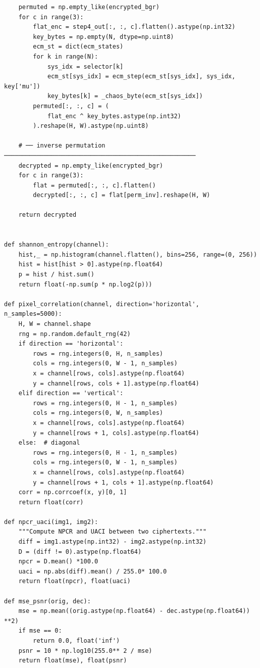 \begin{verbatim}
    permuted = np.empty_like(encrypted_bgr)
    for c in range(3):
        flat_enc = step4_out[:, :, c].flatten().astype(np.int32)
        key_bytes = np.empty(N, dtype=np.uint8)
        ecm_st = dict(ecm_states)
        for k in range(N):
            sys_idx = selector[k]
            ecm_st[sys_idx] = ecm_step(ecm_st[sys_idx], sys_idx, key['mu'])
            key_bytes[k] = _chaos_byte(ecm_st[sys_idx])
        permuted[:, :, c] = (
            flat_enc ^ key_bytes.astype(np.int32)
        ).reshape(H, W).astype(np.uint8)

    # ── inverse permutation ─────────────────────────────────────────────────────
    decrypted = np.empty_like(encrypted_bgr)
    for c in range(3):
        flat = permuted[:, :, c].flatten()
        decrypted[:, :, c] = flat[perm_inv].reshape(H, W)

    return decrypted


def shannon_entropy(channel):
    hist,_ = np.histogram(channel.flatten(), bins=256, range=(0, 256))
    hist = hist[hist > 0].astype(np.float64)
    p = hist / hist.sum()
    return float(-np.sum(p * np.log2(p)))

def pixel_correlation(channel, direction='horizontal', n_samples=5000):
    H, W = channel.shape
    rng = np.random.default_rng(42)
    if direction == 'horizontal':
        rows = rng.integers(0, H, n_samples)
        cols = rng.integers(0, W - 1, n_samples)
        x = channel[rows, cols].astype(np.float64)
        y = channel[rows, cols + 1].astype(np.float64)
    elif direction == 'vertical':
        rows = rng.integers(0, H - 1, n_samples)
        cols = rng.integers(0, W, n_samples)
        x = channel[rows, cols].astype(np.float64)
        y = channel[rows + 1, cols].astype(np.float64)
    else:  # diagonal
        rows = rng.integers(0, H - 1, n_samples)
        cols = rng.integers(0, W - 1, n_samples)
        x = channel[rows, cols].astype(np.float64)
        y = channel[rows + 1, cols + 1].astype(np.float64)
    corr = np.corrcoef(x, y)[0, 1]
    return float(corr)

def npcr_uaci(img1, img2):
    """Compute NPCR and UACI between two ciphertexts."""
    diff = img1.astype(np.int32) - img2.astype(np.int32)
    D = (diff != 0).astype(np.float64)
    npcr = D.mean() *100.0
    uaci = np.abs(diff).mean() / 255.0* 100.0
    return float(npcr), float(uaci)

def mse_psnr(orig, dec):
    mse = np.mean((orig.astype(np.float64) - dec.astype(np.float64)) **2)
    if mse == 0:
        return 0.0, float('inf')
    psnr = 10 * np.log10(255.0** 2 / mse)
    return float(mse), float(psnr)



\end{verbatim}
